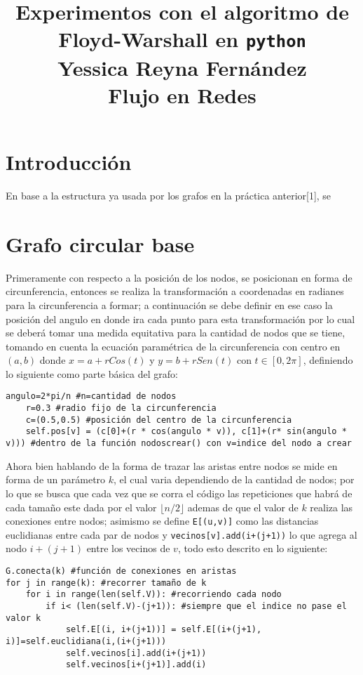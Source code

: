 \documentclass[12pt]{article}
\begin{document}
\title{{\LARGE \textbf{Experimentos con el algoritmo de Floyd-Warshall en \texttt{python}}}\\ {\large Yessica Reyna Fernández}\\{\large Flujo en Redes}}
\maketitle
\section{Introducción}
En base a la estructura ya usada por los grafos en la práctica anterior[1], se 
\section{Grafo circular base}
Primeramente con respecto a la posición de los nodos, se posicionan en forma de circunferencia, entonces se realiza la transformación a coordenadas en radianes para la circunferencia a formar; a continuación se debe definir en ese caso la posición del angulo en donde ira cada punto para esta transformación por lo cual se deberá tomar una medida equitativa para la cantidad de nodos que se tiene, tomando en cuenta la ecuación paramétrica de la circunferencia con centro en $(a,b)$ donde $x=a+rCos(t)$ y $y=b+rSen(t)$ con $t\in[0,2\pi]$, definiendo lo siguiente como parte básica del grafo:
\begin{lstlisting}[style=tt]
	angulo=2*pi/n #n=cantidad de nodos
	r=0.3 #radio fijo de la circunferencia
	c=(0.5,0.5) #posición del centro de la circunferencia
	self.pos[v] = (c[0]+(r * cos(angulo * v)), c[1]+(r* sin(angulo * v))) #dentro de la función nodoscrear() con v=indice del nodo a crear
\end{lstlisting}
Ahora bien hablando de la forma de trazar las aristas entre nodos se mide en forma de un parámetro $k$, el cual varia dependiendo de la cantidad de nodos; por lo que se busca que cada vez que se corra el código las repeticiones que habrá de cada tamaño este dada por el valor $ \lfloor n/2 \rfloor $ ademas de que el valor de $k$ realiza las conexiones entre nodos; asimismo se define \texttt{E[(u,v)]} como las distancias euclidianas entre cada par de nodos y \texttt{vecinos[v].add(i+(j+1))} lo que agrega al nodo $i+(j+1)$  entre los vecinos de $v$, todo esto descrito en lo siguiente:
\begin{lstlisting}[style=tt]
G.conecta(k) #función de conexiones en aristas
for j in range(k): #recorrer tamaño de k
	for i in range(len(self.V)): #recorriendo cada nodo
		if i< (len(self.V)-(j+1)): #siempre que el indice no pase el valor k
			self.E[(i, i+(j+1))] = self.E[(i+(j+1), i)]=self.euclidiana(i,(i+(j+1)))
			self.vecinos[i].add(i+(j+1))
			self.vecinos[i+(j+1)].add(i)
\end{lstlisting}
\end{document}
